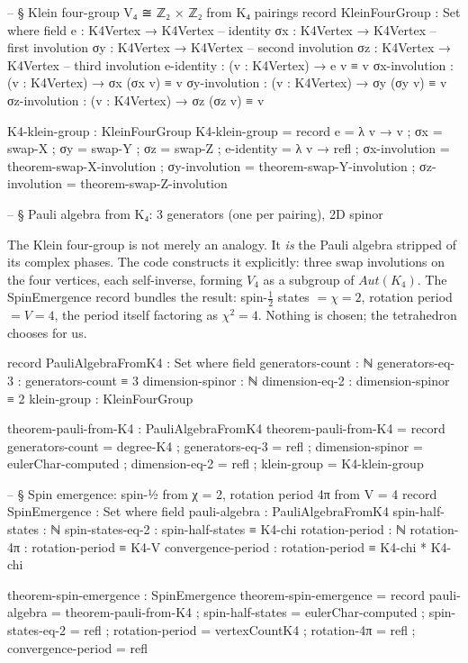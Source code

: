 \documentclass[11pt,a4paper]{book}
\def\mathrm#1{#1}%
\def\texttt#1{#1}%
\begin{document}
\begin{code}
-- § Klein four-group V₄ ≅ ℤ₂ × ℤ₂ from K₄ pairings
record KleinFourGroup : Set where
  field
    e  : K4Vertex → K4Vertex     -- identity
    σx : K4Vertex → K4Vertex     -- first involution
    σy : K4Vertex → K4Vertex     -- second involution
    σz : K4Vertex → K4Vertex     -- third involution
    e-identity     : (v : K4Vertex) → e v ≡ v
    σx-involution  : (v : K4Vertex) → σx (σx v) ≡ v
    σy-involution  : (v : K4Vertex) → σy (σy v) ≡ v
    σz-involution  : (v : K4Vertex) → σz (σz v) ≡ v

K4-klein-group : KleinFourGroup
K4-klein-group = record
  { e  = λ v → v
  ; σx = swap-X
  ; σy = swap-Y
  ; σz = swap-Z
  ; e-identity    = λ v → refl
  ; σx-involution = theorem-swap-X-involution
  ; σy-involution = theorem-swap-Y-involution
  ; σz-involution = theorem-swap-Z-involution }

-- § Pauli algebra from K₄: 3 generators (one per pairing), 2D spinor
\end{code}

The Klein four-group is not merely an analogy. It \emph{is} the Pauli algebra stripped of its complex phases. The code constructs it explicitly: three swap involutions on the four vertices, each self-inverse, forming $V_4$ as a subgroup of $\mathrm{Aut}(K_4)$. The \texttt{SpinEmergence} record bundles the result: spin-$\frac{1}{2}$ states $= \chi = 2$, rotation period $= V = 4$, the period itself factoring as $\chi^2 = 4$. Nothing is chosen; the tetrahedron chooses for us.

\begin{code}
record PauliAlgebraFromK4 : Set where
  field
    generators-count : ℕ
    generators-eq-3  : generators-count ≡ 3
    dimension-spinor : ℕ
    dimension-eq-2   : dimension-spinor ≡ 2
    klein-group      : KleinFourGroup

theorem-pauli-from-K4 : PauliAlgebraFromK4
theorem-pauli-from-K4 = record
  { generators-count = degree-K4
  ; generators-eq-3  = refl
  ; dimension-spinor = eulerChar-computed
  ; dimension-eq-2   = refl
  ; klein-group      = K4-klein-group }

-- § Spin emergence: spin-½ from χ = 2, rotation period 4π from V = 4
record SpinEmergence : Set where
  field
    pauli-algebra      : PauliAlgebraFromK4
    spin-half-states   : ℕ
    spin-states-eq-2   : spin-half-states ≡ K4-chi
    rotation-period    : ℕ
    rotation-4π        : rotation-period ≡ K4-V
    convergence-period : rotation-period ≡ K4-chi * K4-chi

theorem-spin-emergence : SpinEmergence
theorem-spin-emergence = record
  { pauli-algebra      = theorem-pauli-from-K4
  ; spin-half-states   = eulerChar-computed
  ; spin-states-eq-2   = refl
  ; rotation-period    = vertexCountK4
  ; rotation-4π        = refl
  ; convergence-period = refl }
\end{code}
\end{document}
